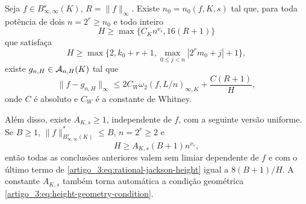 \begin{lemma}\label{map:artigo_3:4.1}
\label{artigo_3:lem:rational-jackson-height}
Seja $f\in B^s_{\infty,\infty}(K)$, $R=\|f\|_\infty$. Existe
$n_0=n_0(f,K,s)$ tal que, para toda potência de dois $n=2^r\ge n_0$ e todo
inteiro
\[
 H\ge\max\{C_Kn^{\nu_s},16(R+1)\}
\]
que satisfaça
\begin{equation}
 H\ge\max\{2,k_0+r+1,
      \max_{0\le j<n}|2^rm_0+j|+1\},
 \label{artigo_3:eq:height-geometry-condition}
\end{equation}
existe $g_{n,H}\in\mathcal{A}_{n,H}(K)$ tal que
\begin{equation}
 \|f-g_{n,H}\|_\infty
 \le 2C_W\omega_2(f,L/n)_{\infty,K}
      +\frac{C(R+1)}{H},
 \label{artigo_3:eq:rational-jackson-height}
\end{equation}
onde $C$ é absoluto e $C_W$ é a constante de Whitney.

Além disso, existe $A_{K,s}\ge1$, independente de $f$, com a seguinte versão
uniforme. Se $B\ge1$, $\|f\|_{B^s_{\infty,\infty}(K)}^*\le B$, $n=2^r\ge2$
e
\begin{equation}
 H\ge A_{K,s}(B+1)n^{\nu_s},
 \label{artigo_3:eq:uniform-ball-height-threshold}
\end{equation}
então todas as conclusões anteriores valem sem limiar dependente de $f$ e com
o último termo de \eqref{artigo_3:eq:rational-jackson-height} igual a
$8(B+1)/H$. A constante $A_{K,s}$ também torna automática a condição
geométrica \eqref{artigo_3:eq:height-geometry-condition}.
\end{lemma}

